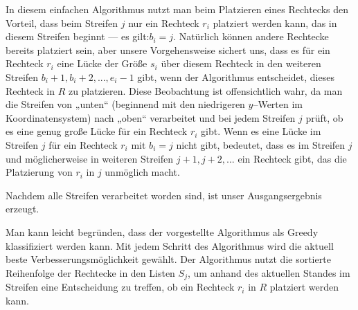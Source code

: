 In diesem einfachen Algorithmus nutzt man beim Platzieren eines Rechtecks den
Vorteil, dass beim Streifen $j$ nur ein Rechteck $r_i$ platziert werden kann, 
das in diesem Streifen beginnt --- es gilt:\break $b_i = j$.
Natürlich können andere Rechtecke bereits platziert sein,
aber unsere Vorgehensweise sichert uns, dass es für ein Rechteck $r_i$
eine Lücke der Größe $s_i$ über diesem Rechteck 
in den weiteren Streifen ${b_i + 1}, b_i + 2, ..., e_i - 1$ 
gibt, wenn der Algorithmus entscheidet, dieses Rechteck in $R$ zu platzieren.
Diese Beobachtung ist offensichtlich wahr, da man die Streifen von „unten“ 
(beginnend mit den niedrigeren $y$--Werten im Koordinatensystem) nach „oben“
verarbeitet und bei jedem Streifen $j$ prüft, ob es eine genug große Lücke für ein Rechteck
$r_i$ gibt.
Wenn es eine Lücke im Streifen $j$ für ein Rechteck $r_i$ mit $b_i = j$ nicht gibt,
bedeutet, dass es im Streifen $j$ und 
möglicherweise in weiteren Streifen $j+1, j+2, ...$ ein Rechteck gibt, das 
die Platzierung von $r_i$ in $j$ unmöglich macht.

Nachdem alle Streifen verarbeitet worden sind, ist unser Ausgangsergebnis erzeugt.

Man kann leicht begründen, dass der vorgestellte Algorithmus als Greedy klassifiziert werden
kann.
Mit jedem Schritt des Algorithmus wird die aktuell beste Verbesserungsmöglichkeit gewählt.
Der Algorithmus nutzt die sortierte Reihenfolge der Rechtecke in den Listen $S_j$, um anhand
des aktuellen Standes im Streifen eine Entscheidung zu treffen, ob ein Rechteck $r_i$ in $R$
platziert werden kann.



